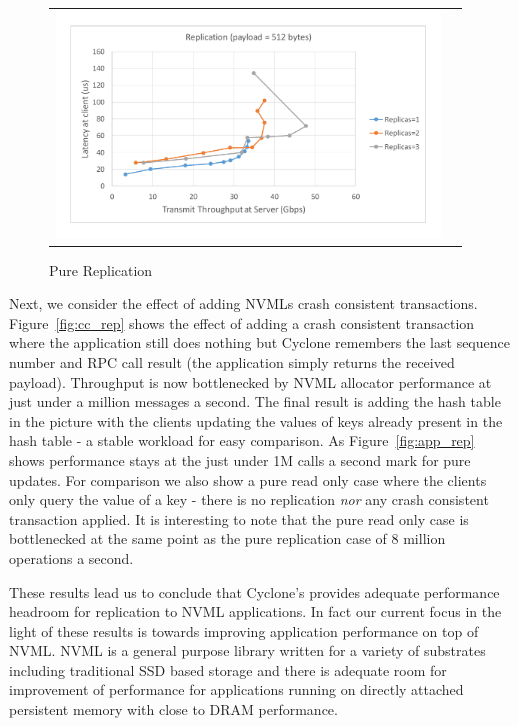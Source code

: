 \documentclass[letterpaper,twocolumn,10pt]{article}
\begin{document}
\begin{figure}
\begin{tabular}{cc}
\begin{minipage}{0.5\textwidth}
  \includegraphics[width=\textwidth,height=6cm]{results/replication_gbps_512.pdf}
\end{minipage}
\end{tabular}
\caption{Pure Replication}
\label{fig:pure_rep}
\end{figure}

Next, we consider the effect of adding NVMLs crash consistent
transactions. Figure~\ref{fig:cc_rep} shows the effect of adding a crash
consistent transaction where the application still does nothing but Cyclone
remembers the last sequence number and RPC call result (the application simply
returns the received payload). Throughput is now bottlenecked by NVML allocator
performance at just under a million messages a second. The final result is
adding the hash table in the picture with the clients updating the values of
keys already present in the hash table - a stable workload for easy
comparison. As Figure~\ref{fig:app_rep} shows performance stays at the just
under 1M calls a second mark for pure updates. For comparison we also show a
pure read only case where the clients only query the value of a key - there is
no replication \emph{nor} any crash consistent transaction applied. It is
interesting to note that the pure read only case is bottlenecked at the same
point as the pure replication case of 8 million operations a second.

These results lead us to conclude that Cyclone's provides adequate performance
headroom for replication to NVML applications. In fact our current focus in the
light of these results is towards improving application performance on top of
NVML. NVML is a general purpose library written for a variety of substrates
including traditional SSD based storage and there is adequate room for
improvement of performance for applications running on directly attached
persistent memory with close to DRAM performance.
\end{document}
